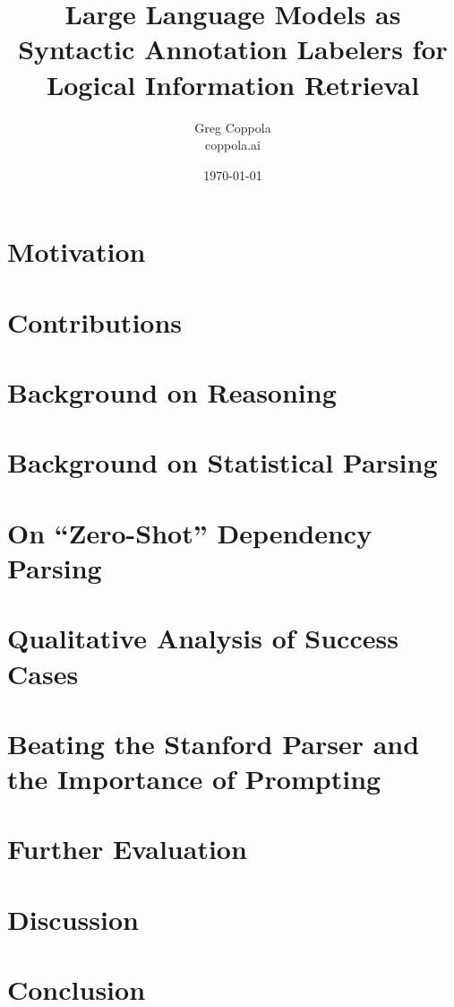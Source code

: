 \documentclass[11pt]{article}
\title{Large Language Models as Syntactic Annotation Labelers for Logical Information Retrieval}
\author{Greg Coppola\\coppola.ai}
\date{\today}
\begin{document}
\maketitle



\section{Motivation}


\section{Contributions}


\section{Background on Reasoning}


\section{Background on Statistical Parsing}


\section{On ``Zero-Shot'' Dependency Parsing}


\section{Qualitative Analysis of Success Cases}

\section{Beating the Stanford Parser and the Importance of Prompting}



\section{Further Evaluation}


\section{Discussion}


\section{Conclusion}




\end{document}
